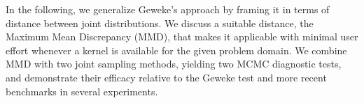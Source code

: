 \documentclass{article}
\begin{document}
In the following, we generalize Geweke's approach by framing it in terms of distance between joint distributions. We discuss a suitable distance, the Maximum Mean Discrepancy (MMD), that makes it applicable with minimal user effort whenever a kernel is available for the given problem domain. We combine MMD with two joint sampling methods, yielding two MCMC diagnostic tests, and demonstrate their efficacy relative to the Geweke test and more recent benchmarks in several experiments.


\end{document}
